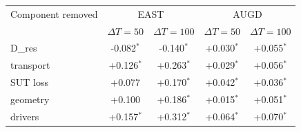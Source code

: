 \begin{tabular}{lcccc}
\toprule
Component removed & \multicolumn{2}{c}{EAST} & \multicolumn{2}{c}{AUGD} \\
 & $\Delta T{=}50$ & $\Delta T{=}100$ & $\Delta T{=}50$ & $\Delta T{=}100$ \\
\midrule
D_res & -0.082$^*$ & -0.140$^*$ & +0.030$^*$ & +0.055$^*$ \\
transport & +0.126$^*$ & +0.263$^*$ & +0.029$^*$ & +0.056$^*$ \\
SUT loss & +0.077 & +0.170$^*$ & +0.042$^*$ & +0.036$^*$ \\
geometry & +0.100 & +0.186$^*$ & +0.015$^*$ & +0.051$^*$ \\
drivers & +0.157$^*$ & +0.312$^*$ & +0.064$^*$ & +0.070$^*$ \\
\bottomrule
\end{tabular}
